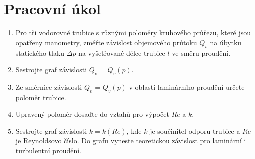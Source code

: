 \documentclass[a4paper]{article}
\author{"Patrik Novotný"}
\begin{document}
\section*{Pracovní úkol}
\begin{enumerate}
\item Pro tři vodorovné trubice s různými poloměry kruhového průřezu, které jsou opatřeny manometry, změřte závislost objemového průtoku $Q_{v}$ na úbytku statického tlaku $\Delta p$ na vyšetřované délce trubice $l$ ve směru proudění.
\item Sestrojte graf závislosti $Q_{v}$ = $Q_{v}(p)$.
\item Ze směrnice závislosti $Q_{v}$ = $Q_{v}(p)$ v oblasti laminárního proudění určete poloměr trubice.
\item Upravený poloměr dosaďte do vztahů pro výpočet $Re$ a $k$.
\item Sestrojte graf závislosti $k = k(Re)$, kde $k$ je součinitel odporu trubice a $Re$ je Reynoldsovo číslo. Do grafu vyneste teoretickou závislost pro laminární i turbulentní proudění.
\end{enumerate}
\end{document}
